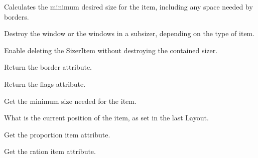 \label{wxsizeritemcalcmin}


Calculates the minimum desired size for the item, including any space
needed by borders.


\label{wxsizeritemdeletewindows}


Destroy the window or the windows in a subsizer, depending on the type
of item.


\label{wxsizeritemdetachsizer}


Enable deleting the SizerItem without destroying the contained sizer.


\label{wxsizeritemgetborder}


Return the border attribute.

\label{wxsizeritemgetflag}


Return the flags attribute.


\label{wxsizeritemgetminsize}


Get the minimum size needed for the item.

\label{wxsizeritemgetposition}


What is the current position of the item, as set in the last Layout.

\label{wxsizeritemgetproportion}


Get the proportion item attribute.

\label{wxsizeritemgetratio}


Get the ration item attribute.

\label{wxsizeritemgetrect}


